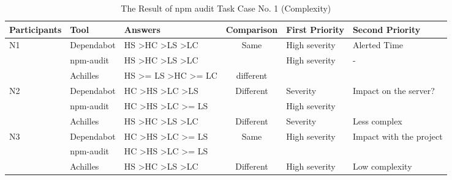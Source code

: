 \documentclass[conference]{IEEEtran}
\begin{document}
	\begin{table}[tb]
		\centering
		\caption{The Result of npm audit Task Case No. 1 (Complexity)}
		\begin{tabular}{|l|l|l|c|l|l|}
			\hline
			Participants         & Tool       & Answers                                                     & \multicolumn{1}{l|}{Comparison} & First Priority                    & Second Priority            \\ \hline
			\multirow{3}{*}{N1}  & Dependabot & HS \textgreater HC \textgreater LS \textgreater LC          & \multirow{2}{*}{Same}           & High severity                     & Alerted Time               \\ \cline{2-3} \cline{5-6} 
			& npm-audit  & HS \textgreater HC \textgreater LS \textgreater LC          &                                 & High severity                     & -                          \\ \cline{2-6} 
			& Achilles   & HS \textgreater{}= LS \textgreater HC \textgreater{}= LC    & different                       &                                   &                            \\ \hline
			\multirow{3}{*}{N2}  & Dependabot & HC \textgreater HS \textgreater LC \textgreater LS          & \multirow{2}{*}{Different}      & Severity                          & Impact on the server?      \\ \cline{2-3} \cline{5-6} 
			& npm-audit  & HC \textgreater HS \textgreater LC \textgreater{}= LS       &                                 & High severity                     &                            \\ \cline{2-6} 
			& Achilles   & HS \textgreater HC \textgreater LS \textgreater LC          & Different                       & Severity                          & Less complex               \\ \hline
			\multirow{3}{*}{N3}  & Dependabot & HC \textgreater HS \textgreater LC \textgreater{}= LS       & \multirow{2}{*}{Same}           & High severity                     & Impact with the project    \\ \cline{2-3} \cline{5-6} 
			& npm-audit  & HC \textgreater HS \textgreater LC \textgreater{}= LS       &                                 &                                   &                            \\ \cline{2-6} 
			& Achilles   & HS \textgreater HC \textgreater LS \textgreater LC          & Different                       & High severity                     & Low complexity             \\ \hline

\end{tabular}
\end{table}
\end{document}
